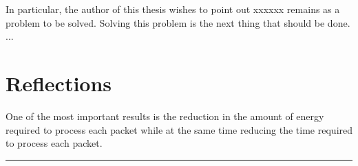In particular, the author of this thesis wishes to point out xxxxxx remains as a problem to be solved. Solving this problem is the next thing that should be done. ...


\section{Reflections}
\label{sec:reflections}






One of the most important results is the reduction in the amount of
energy required to process each packet while at the same time reducing the
time required to process each packet.




\noindent\rule{\textwidth}{0.4mm}




\cleardoublepage